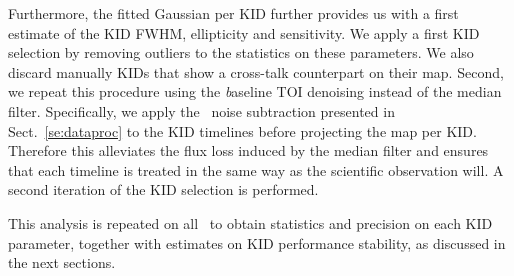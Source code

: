 {\lp Furthermore, the fitted Gaussian per KID further provides us with
a first estimate of the KID FWHM, ellipticity and sensitivity. 
We apply a first KID selection by removing outliers to the statistics
on these parameters. We also discard manually KIDs that show a
cross-talk counterpart on their map. Second,  we repeat this
procedure using the {\emph baseline} TOI denoising instead of the
median filter. Specifically, we apply the \cmoneb\ noise subtraction
presented in Sect.~\ref{se:dataproc} to the KID timelines before
projecting the map per KID. Therefore this alleviates the flux loss
induced by the median filter and ensures that each timeline is treated
in the same way as the scientific observation will. A second iteration
of the KID selection is performed.} 


This analysis is repeated on all \bms\ to obtain statistics and
precision on each KID parameter, together with estimates on KID
performance stability, as discussed in the next sections.

